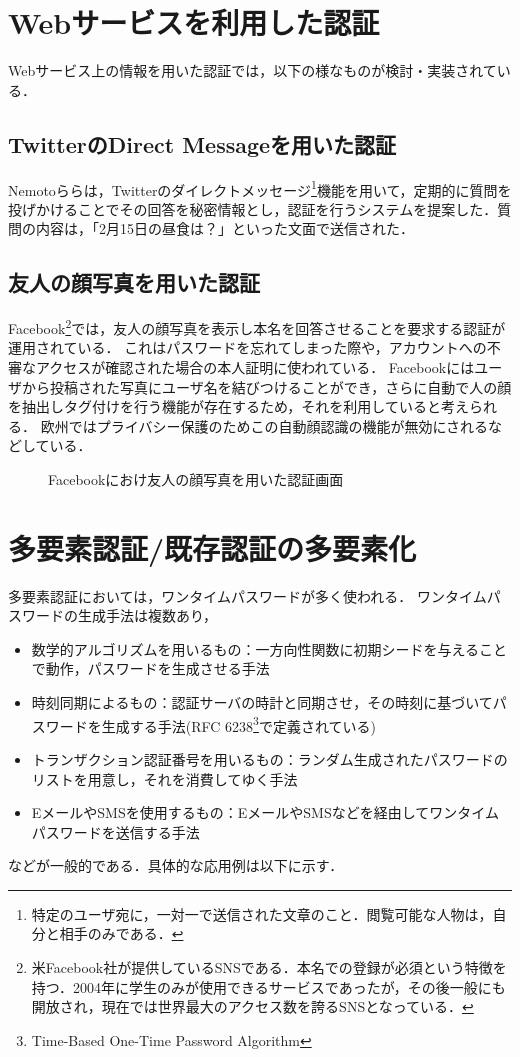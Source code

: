 \section{Webサービスを利用した認証}
Webサービス上の情報を用いた認証では，以下の様なものが検討・実装されている．

\subsection{TwitterのDirect Messageを用いた認証}
Nemotoら\cite{nemoto:2006-03-15}らは，Twitterのダイレクトメッセージ\footnote{特定のユーザ宛に，一対一で送信された文章のこと．閲覧可能な人物は，自分と相手のみである．}機能を用いて，定期的に質問を投げかけることでその回答を秘密情報とし，認証を行うシステムを提案した．質問の内容は，「2月15日の昼食は？」といった文面で送信された．

\subsection{友人の顔写真を用いた認証}
Facebook\footnote{米Facebook社が提供しているSNSである．本名での登録が必須という特徴を持つ．2004年に学生のみが使用できるサービスであったが，その後一般にも開放され，現在では世界最大のアクセス数を誇るSNSとなっている．}では，友人の顔写真を表示し本名を回答させることを要求する認証が運用されている．
これはパスワードを忘れてしまった際や，アカウントへの不審なアクセスが確認された場合の本人証明に使われている．
Facebookにはユーザから投稿された写真にユーザ名を結びつけることができ，さらに自動で人の顔を抽出しタグ付けを行う機能が存在するため，それを利用していると考えられる．
欧州ではプライバシー保護のためこの自動顔認識の機能が無効にされるなどしている．

\begin{figure}[ht]
\begin{center}
\end{center}
\caption{Facebookにおけ友人の顔写真を用いた認証画面}
\label{fig:facebookFaceAuth}
\end{figure}

\section{多要素認証/既存認証の多要素化}\label{sec:multifactor}
多要素認証においては，ワンタイムパスワードが多く使われる．
ワンタイムパスワードの生成手法は複数あり，
\begin{itemize}
\item 数学的アルゴリズムを用いるもの：一方向性関数に初期シードを与えることで動作，パスワードを生成させる手法
\item 時刻同期によるもの：認証サーバの時計と同期させ，その時刻に基づいてパスワードを生成する手法(RFC 6238\footnote{Time-Based One-Time Password Algorithm}で定義されている)
\item トランザクション認証番号を用いるもの：ランダム生成されたパスワードのリストを用意し，それを消費してゆく手法
\item EメールやSMSを使用するもの：EメールやSMSなどを経由してワンタイムパスワードを送信する手法
\end{itemize}
などが一般的である．具体的な応用例は以下に示す．

